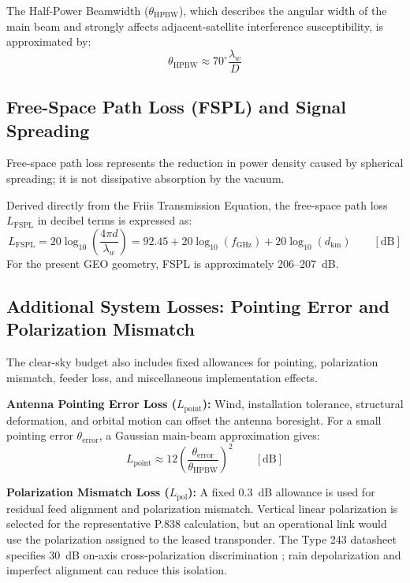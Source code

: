 The Half-Power Beamwidth ($\theta_{\mathrm{HPBW}}$), which describes the angular width of the main beam and strongly affects adjacent-satellite interference susceptibility, is approximated by:
\begin{equation}
    \theta_{\mathrm{HPBW}} \approx 70^\circ \frac{\lambda_w}{D}
\end{equation}

\subsection{Free-Space Path Loss (FSPL) and Signal Spreading}
Free-space path loss represents the reduction in power density caused by spherical spreading; it is not dissipative absorption by the vacuum.

Derived directly from the Friis Transmission Equation, the free-space path loss $L_{\mathrm{FSPL}}$ in decibel terms is expressed as:
\begin{equation}
    L_{\mathrm{FSPL}}
    =
    20\log_{10}\left( \frac{4\pi d}{\lambda_w} \right)
    =
    92.45
    +
    20\log_{10}(f_{\mathrm{GHz}})
    +
    20\log_{10}(d_{\mathrm{km}})
    \qquad [\mathrm{dB}]
\end{equation}
For the present GEO geometry, FSPL is approximately 206--207~dB.

\subsection{Additional System Losses: Pointing Error and Polarization Mismatch}
The clear-sky budget also includes fixed allowances for pointing, polarization mismatch, feeder loss, and miscellaneous implementation effects.

\textbf{Antenna Pointing Error Loss ($L_{\mathrm{point}}$):} Wind, installation tolerance, structural deformation, and orbital motion can offset the antenna boresight. For a small pointing error $\theta_{\mathrm{error}}$, a Gaussian main-beam approximation gives:
\begin{equation}
    L_{\mathrm{point}}
    \approx
    12
    \left( \frac{\theta_{\mathrm{error}}}{\theta_{\mathrm{HPBW}}} \right)^2
    \qquad [\mathrm{dB}]
\end{equation}

\textbf{Polarization Mismatch Loss ($L_{\mathrm{pol}}$):} A fixed 0.3~dB allowance is used for residual feed alignment and polarization mismatch. Vertical linear polarization is selected for the representative P.838 calculation, but an operational link would use the polarization assigned to the leased transponder. The Type 243 datasheet specifies 30~dB on-axis cross-polarization discrimination \cite{skyware_24m}; rain depolarization and imperfect alignment can reduce this isolation.

